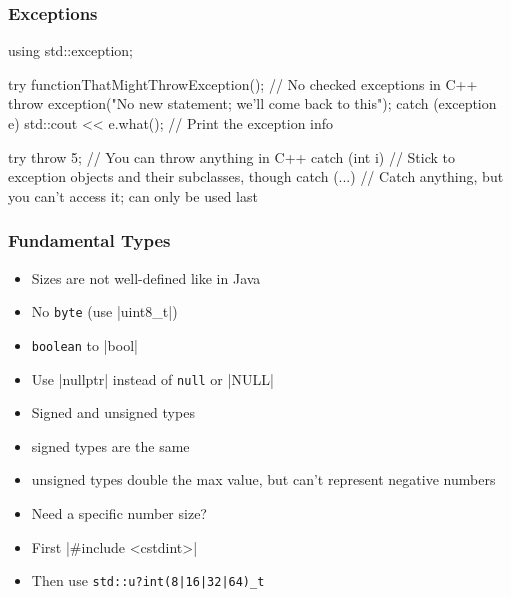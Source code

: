 \documentclass[glossy]{beamer}
\begin{document}
\begin{frame}[fragile=singleslide]
\end{frame}

\begin{frame}[fragile=singleslide]
  \frametitle{Exceptions}
  \begin{cppcode}
using std::exception;

try {
  functionThatMightThrowException(); // No checked exceptions in C++
  throw exception("No new statement; we'll come back to this");
}
catch (exception e) {
  std::cout << e.what(); // Print the exception info
}

try {
  throw 5; // You can throw anything in C++
} catch (int i) {
  // Stick to exception objects and their subclasses, though
} catch (...) {
  // Catch anything, but you can't access it; can only be used last
}
  \end{cppcode}
\end{frame}

\begin{frame}[fragile=singleslide]
  \frametitle{Fundamental Types}
  \begin{itemize}
    \item Sizes are not well-defined like in Java
    \item No \verb|byte| (use \cppinline|uint8_t|)
    \item \verb|boolean| to \cppinline|bool|
    \item Use \cppinline|nullptr| instead of \verb|null| or \cppinline|NULL|
    \item Signed and unsigned types
    \item signed types are the same
    \item unsigned types double the max value, but can't represent negative numbers
    \item Need a specific number size?
    \item First \cppinline|#include <cstdint>|
    \item Then use \verb!std::u?int(8|16|32|64)_t!
  \end{itemize}
\end{frame}
\end{document}
